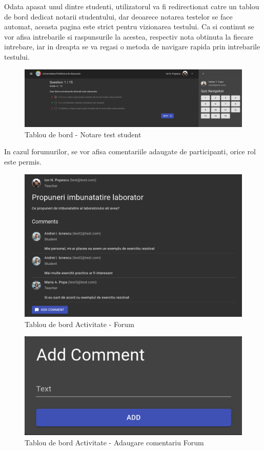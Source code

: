 \documentclass[12pt, a4paper, oneside, romanian]{teza-upb}
\begin{document}
Odata apasat unul dintre studenti, utilizatorul va fi redirectionat catre un tablou de bord dedicat notarii studentului, dar deoarece notarea testelor se face automat, aceasta pagina este strict pentru vizionarea testului. Ca si continut se vor afisa intrebarile si raspunsurile la acestea, respectiv nota obtinuta la fiecare intrebare, iar in dreapta se va regasi o metoda de navigare rapida prin intrebarile testului.

\begin{figure}[H]
\centering
\includegraphics*[width=\columnwidth]{tablou-de-bord-notare-test-student}
\caption{Tablou de bord - Notare test student}
\label{tablou-de-bord-notare-test-student}
\end{figure}

In cazul forumurilor, se vor afisa comentariile adaugate de participanti, orice rol este permis.

\begin{figure}[H]
\centering
\includegraphics*[width=\columnwidth]{tablou-de-bord-forum}
\caption{Tablou de bord Activitate - Forum}
\label{tablou-de-bord-forum}
\end{figure}

\begin{figure}[H]
\centering
\includegraphics*[width=0.5\columnwidth]{tablou-de-bord-activitate-adaugare-comentariu-forum}
\caption{Tablou de bord Activitate - Adaugare comentariu Forum}
\label{tablou-de-bord-activitate-adaugare-comentariu-forum}
\end{figure}
\end{document}

